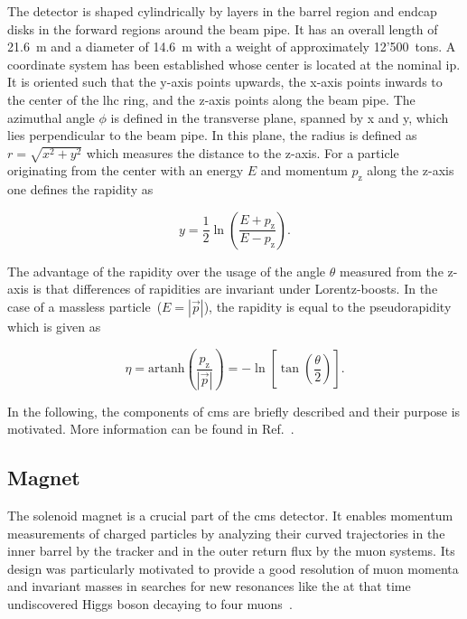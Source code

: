 
The detector is shaped cylindrically by layers in the barrel region and endcap disks in the forward regions around the beam pipe. It has an overall length of 21.6~m and a diameter of 14.6~m with a weight of approximately 12'500~tons. A coordinate system has been established whose center is located at the nominal \gls{ip}. It is oriented such that the y-axis points upwards, the x-axis points inwards to the center of the \gls{lhc} ring, and the z-axis points along the beam pipe. The azimuthal angle $\phi$ is defined in the transverse plane, spanned by x and y, which lies perpendicular to the beam pipe. In this plane, the radius is defined as $r=\sqrt{x^2+y^2}$ which measures the distance to the z-axis. For a particle originating from the center with an energy $E$ and momentum $p_\mathrm{z}$ along the z-axis one defines the rapidity as

\begin{equation}
y=\frac{1}{2}\ln\left(\frac{E+p_\mathrm{z}}{E-p_\mathrm{z}}\right). \label{eq:experiment-rapidity}
\end{equation}

The advantage of the rapidity over the usage of the angle $\theta$ measured from the z-axis is that differences of rapidities are invariant under Lorentz-boosts. In the case of a massless particle~($E=|\vec{p}|$), the rapidity is equal to the pseudorapidity which is given as

\begin{equation}
\eta=\mathrm{artanh}\left(\frac{p_\mathrm{z}}{|\vec{p}|}\right)=-\ln\left[\tan\left(\frac{\theta}{2}\right)\right]. \label{eq:experiment-pseudorapidity}
\end{equation}

In the following, the components of \gls{cms} are briefly described and their purpose is motivated. More information can be found in Ref.~\cite{Bayatian:922757,Chatrchyan:2008aa}.


\subsection{Magnet}

The solenoid magnet is a crucial part of the \gls{cms} detector. It enables momentum measurements of charged particles by analyzing their curved trajectories in the inner barrel by the tracker and in the outer return flux by the muon systems. Its design was particularly motivated to provide a good resolution of muon momenta and invariant masses in searches for new resonances like the at that time undiscovered Higgs boson decaying to four muons~\cite{Acquistapace:1997fm}. 

